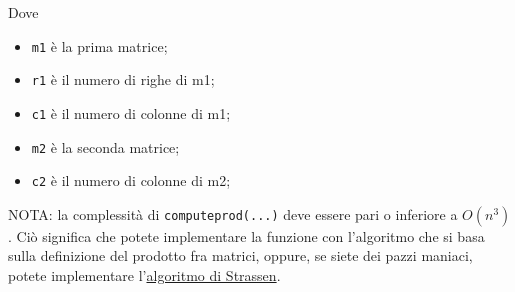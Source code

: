 \documentclass{article}
\begin{document}
    Dove
    \begin{itemize}
        \item \texttt{m1} è la prima matrice;
        \item \texttt{r1} è il numero di righe di m1;
        \item \texttt{c1} è il numero di colonne di m1;
        \item \texttt{m2} è la seconda matrice;
        \item \texttt{c2} è il numero di colonne di m2;
    \end{itemize}
    NOTA: la complessità di \texttt{compute\textunderscore prod(...)} deve essere pari o inferiore a $O(n^3)$.
    Ciò significa che potete implementare la funzione con l'algoritmo che si basa sulla definizione del prodotto fra matrici, oppure, se siete dei pazzi maniaci, potete implementare l'\color{blue}\href{https://it.wikipedia.org/wiki/Algoritmo\textunderscore di\textunderscore Strassen}{algoritmo di Strassen}\color{black}.
\end{document}
